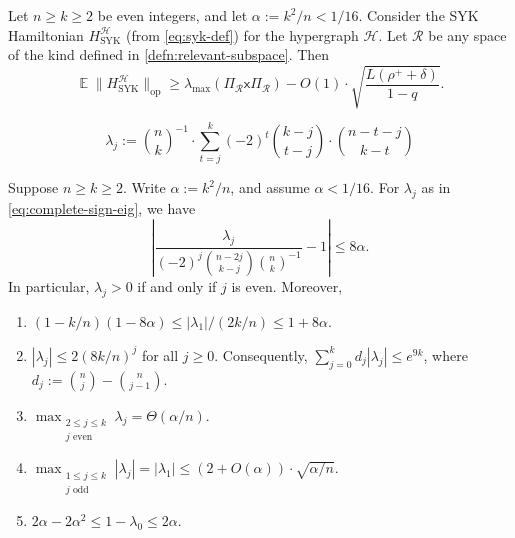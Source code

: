 \documentclass[10pt,a4paper]{amsart}
\DeclareMathOperator*{\E}{\mathbb{E}}
\newcommand{\cH}{\mathcal H}
\newcommand{\cR}{\mathcal R}
\newcommand{\sfx}{\mathsf x}
\renewcommand{\geq}{\geqslant}
\renewcommand{\leq}{\leqslant}
\begin{document}
\begin{lemma}\label{lem:lower-bound-syk-general}
    Let $n\geq k\geq 2$ be even integers, and let $\alpha:= k^2/n < 1/16$. Consider the SYK Hamiltonian $H^\cH_{\operatorname{SYK}}$ (from \cref{eq:syk-def}) for the hypergraph $\cH$. Let $\cR$ be any space of the kind defined in \cref{defn:relevant-subspace}. Then
    \[\E\|H^\cH_{\operatorname{SYK}}\|_{\operatorname{op}}\geq \lambda_{\max}(\Pi_\cR\sfx\Pi_\cR) - O(1)\cdot \sqrt{\frac{L(\rho^+ + \delta)}{1 - q}}.\]
\end{lemma}

\begin{equation}\label{eq:complete-sign-eig}
    \lambda_j:= \binom{n}{k}^{-1}\cdot\sum_{t = j}^k(-2)^t\binom{k - j}{t - j}\cdot\binom{n - t - j}{k - t}
\end{equation}

\begin{lemma}\label{lem:complete-matrix-values}
    Suppose $n\geq k\geq 2$. Write $\alpha:= k^2/n$, and assume $\alpha < 1/16$. For $\lambda_j$ as in \cref{eq:complete-sign-eig}, we have
    \begin{equation}\label{eq:lambdaj-estimate}
        \left|\frac{\lambda_j}{(-2)^j\binom{n - 2j}{k - j}\binom{n}{k}^{-1}} - 1\right|\leq 8\alpha.
    \end{equation}
    In particular, $\lambda_j > 0$ if and only if $j$ is even. Moreover, 
    \begin{enumerate}[(1)]
        \item\label{item:lambda1-bound} $(1 - k/n)(1 - 8\alpha)\leq |\lambda_1|/(2k/n)\leq 1 + 8\alpha$.
        \item\label{item:lambdaj-bound} $|\lambda_j|\leq 2(8k/n)^j$ for all $j\geq 0$. Consequently, $\sum_{j = 0}^{k}d_j|\lambda_j|\leq e^{9k}$, where $d_j:= \binom{n}{j} - \binom{n}{j - 1}$.
        \item\label{item:even-lambdaj-upperbound} $\max_{\substack{2\leq j\leq k\\j\text{ even}}}\lambda_j = \Theta(\alpha/n)$.
        \item\label{item:odd-lambdaj-upperbound} $\max_{\substack{1\leq j\leq k\\j\text{ odd}}}|\lambda_j| = |\lambda_1| \leq (2 + O(\alpha))\cdot\sqrt{\alpha/n}$.
        \item $2\alpha - 2\alpha^2\leq 1 - \lambda_0\leq 2\alpha$. 
    \end{enumerate}
\end{lemma}
\end{document}
